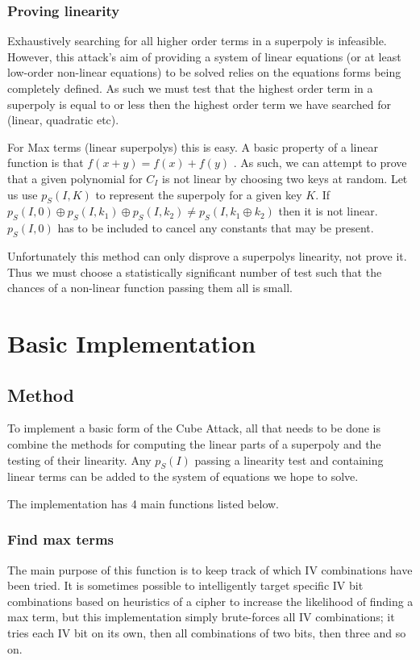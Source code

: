 \documentclass{report}
\let\Oldsection\section
\renewcommand{\section}{\FloatBarrier\Oldsection}
\let\Oldsubsection\subsection
\renewcommand{\subsection}{\FloatBarrier\Oldsubsection}
\let\Oldsubsubsection\subsubsection
\renewcommand{\subsubsection}{\FloatBarrier\Oldsubsubsection}
\begin{document}
\subsubsection{Proving linearity}
Exhaustively searching for all higher order terms in a superpoly is infeasible. However, this attack's aim of providing a system of linear equations (or at least low-order non-linear equations) to be solved relies on the equations forms being completely defined. As such we must test that the highest order term in a superpoly is equal to or less then the highest order term we have searched for (linear, quadratic etc).

For Max terms (linear superpolys) this is easy. A basic property of a linear function is that $f(x+y)=f(x)+f(y)$ \cite{linearproperties}.
As such, we can attempt to prove that a given polynomial for $C_I$ is not linear by choosing two keys at random. Let us use $p_S(I,K)$ to represent the superpoly for a given key $K$. If $p_S(I,0) \oplus p_S(I, k_1)\oplus p_S(I, k_2) \neq p_S(I, k_1 \oplus k_2)$ then it is not linear. $p_S(I, 0)$ has to be included to cancel any constants that may be present.

Unfortunately this method can only disprove a superpolys linearity, not prove it. Thus we must choose a statistically significant number of test such that the chances of a non-linear function passing them all is small.

\section{Basic Implementation}
\subsection{Method}
To implement a basic form of the Cube Attack, all that needs to be done is combine the methods for computing the linear parts of a superpoly and the testing of their linearity. Any $p_S(I)$ passing a linearity test and containing linear terms can be added to the system of equations we hope to solve.

The implementation has 4 main functions listed below.

\subsubsection{Find max terms}
The main purpose of this function is to keep track of which IV combinations have been tried. It is sometimes possible to intelligently target specific IV bit combinations based on heuristics of a cipher to increase the likelihood of finding a max term, but this implementation simply brute-forces all IV combinations; it tries each IV bit on its own, then all combinations of two bits, then three and so on.
\end{document}
